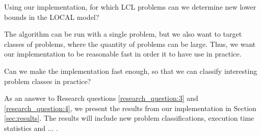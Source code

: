 \begin{researchquestion} \label{research_question:3}
Using our implementation, for which LCL problems can we determine new lower bounds in the LOCAL model?
\end{researchquestion}

The algorithm can be run with a single problem, but we also want to target classes of problems, where the quantity of problems can be large.
Thus, we want our implementation to be reasonable fast in order it to have use in practice.

\begin{researchquestion} \label{research_question:4}
Can we make the implementation fast enough, so that we can classify interesting problem classes in practice?
\end{researchquestion}

As an answer to Research questions \ref{research_question:3} and \ref{research_question:4}, we present the results from our implementation in Section \ref{sec:results}.
The results will include new problem classifications, execution time statistics and ... .
